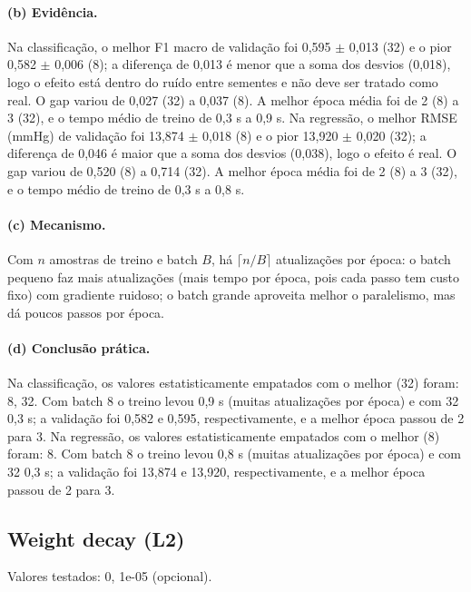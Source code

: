 \documentclass[11pt,a4paper]{article}
\begin{document}
\paragraph{(b) Evidência.} Na classificação, o melhor F1 macro de validação foi 0,595 $\pm$ 0,013 (32) e o pior 0,582 $\pm$ 0,006 (8); a diferença de 0,013 é menor que a soma dos desvios (0,018), logo o efeito está dentro do ruído entre sementes e não deve ser tratado como real. O gap variou de 0,027 (32) a 0,037 (8). A melhor época média foi de 2 (8) a 3 (32), e o tempo médio de treino de 0,3 s a 0,9 s. Na regressão, o melhor RMSE (mmHg) de validação foi 13,874 $\pm$ 0,018 (8) e o pior 13,920 $\pm$ 0,020 (32); a diferença de 0,046 é maior que a soma dos desvios (0,038), logo o efeito é real. O gap variou de 0,520 (8) a 0,714 (32). A melhor época média foi de 2 (8) a 3 (32), e o tempo médio de treino de 0,3 s a 0,8 s.

\paragraph{(c) Mecanismo.} Com $n$ amostras de treino e batch $B$, há $\lceil n/B \rceil$ atualizações por época: o batch pequeno faz mais atualizações (mais tempo por época, pois cada passo tem custo fixo) com gradiente ruidoso; o batch grande aproveita melhor o paralelismo, mas dá poucos passos por época.

\paragraph{(d) Conclusão prática.} Na classificação, os valores estatisticamente empatados com o melhor (32) foram: 8, 32. Com batch 8 o treino levou 0,9 s (muitas atualizações por época) e com 32 0,3 s; a validação foi 0,582 e 0,595, respectivamente, e a melhor época passou de 2 para 3. Na regressão, os valores estatisticamente empatados com o melhor (8) foram: 8. Com batch 8 o treino levou 0,8 s (muitas atualizações por época) e com 32 0,3 s; a validação foi 13,874 e 13,920, respectivamente, e a melhor época passou de 2 para 3.

\subsection{Weight decay (L2)}
Valores testados: 0, 1e-05 (opcional).
\end{document}
